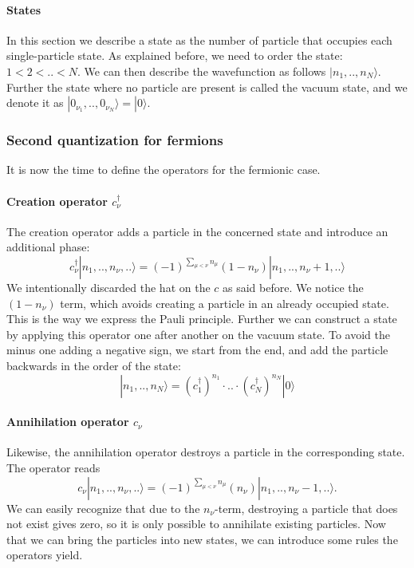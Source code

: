 \documentclass[../main.tex]{subfile}
\begin{document}
\paragraph{States} $~$\\

In this section we describe a state as the number of particle that occupies each single-particle state. As explained before, we need to
order the state: $1<2<..<N$. We can then describe the wavefunction as follows $|n_{1},..,n_{N}\rangle$.\\

Further the state where no particle are present is called the vacuum state, and we denote it as $|0_{\nu_1},..,0_{\nu_N}\rangle = |0\rangle$.

\subsubsection{Second quantization for fermions}$~$\\

It is now the time to define the operators for the fermionic case.
\paragraph{Creation operator $c_\nu^{\dagger}$}$~$\\

The creation operator adds a particle in the concerned state and introduce an additional phase:
\[
    c_{\nu}^{\dagger} |n_{1},..,n_{\nu},..\rangle = (-1)^{\sum_{\mu<\nu}n_{\mu}} (1-n_{\nu})|n_{1},..,n_{\nu}+1,..\rangle
\]
We intentionally discarded the hat on the $c$ as said before.
We notice the $ (1-n_{\nu})$ term, which avoids creating a particle in an already occupied state. This is the way we express
the Pauli principle. 
Further we can construct a state by applying this operator one after another on the vacuum state. To avoid the minus one adding a negative sign, we start from the 
end, and add the particle backwards in the order of the state:
\[
    |n_{1},..,n_{N}\rangle = (c_{1}^{\dagger})^{n_{1}}\cdot ..\cdot (c_{N}^{\dagger})^{n_{N}} |0\rangle
\]  

\paragraph{Annihilation operator $c_\nu$}$~$\\

Likewise, the annihilation operator destroys a particle in the corresponding state. The operator reads
\[
    c_{\nu} |n_{1},..,n_{\nu},..\rangle = (-1)^{\sum_{\mu<\nu}n_{\mu}} (n_{\nu})|n_{1},..,n_{\nu}-1,..\rangle.
\]
We can easily recognize that due to the $n_{\nu}$-term, destroying a particle that does not exist gives zero, 
so it is only possible to annihilate existing particles. Now that we can bring the particles into new states, we can introduce some rules
the operators yield.
\end{document}
